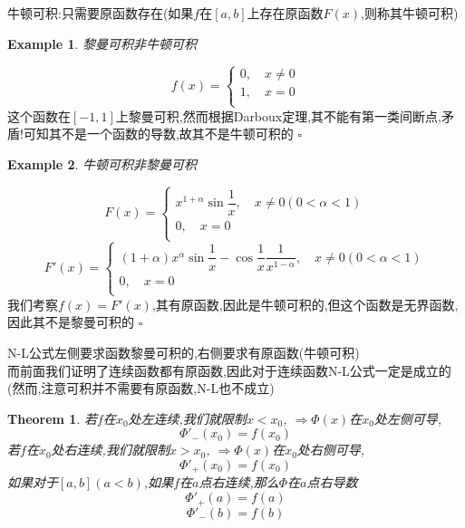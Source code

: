 \documentclass[11pt,hyperref,a4paper,UTF8]{ctexart}
\newtheorem{theorem}{Theorem}[subsection]
\newtheorem{example}{Example}[subsection]
\newenvironment{cproof}{%
\heiti{证明}\kaishu
}{%
  \hfill $\square$
  \par\bigskip
}
\begin{document}
\begin{CJK}{UTF8}{gkai}
牛顿可积:只需要原函数存在(如果$f$在$[a,b]$上存在原函数$F(x)$,则称其牛顿可积)
\begin{example}
  黎曼可积非牛顿可积
\end{example}
\begin{cproof}
  \begin{equation*}
    f(x) = \begin{cases}
      0,\quad x \neq 0\\
      1,\quad x = 0\\
    \end{cases}
  \end{equation*}
这个函数在$[-1,1]$上黎曼可积,然而根据Darboux定理,其不能有第一类间断点,矛盾!可知其不是一个函数的导数,故其不是牛顿可积的
\end{cproof}
\begin{example}
牛顿可积非黎曼可积
\end{example}
\begin{cproof}
  \begin{equation*}
    F(x) = \begin{cases}
      x^{1 + \alpha}\sin \dfrac{1}{x},\quad x \neq 0(0 < \alpha < 1)\\
      0,\quad x = 0\\
    \end{cases}
  \end{equation*}
  \begin{equation*}
    F'(x) = \begin{cases}
      (1 + \alpha)x^{\alpha}\sin \dfrac{1}{x} -\cos \dfrac{1}{x} \dfrac{1}{x^{1 - \alpha}},\quad x \neq 0(0 < \alpha < 1)\\
      0,\quad x = 0\\
    \end{cases}
  \end{equation*}  
我们考察$f(x) = F'(x)$,其有原函数,因此是牛顿可积的,但这个函数是无界函数,因此其不是黎曼可积的
\end{cproof}

N-L公式左侧要求函数黎曼可积的,右侧要求有原函数(牛顿可积)\\

而前面我们证明了连续函数都有原函数,因此对于连续函数N-L公式一定是成立的(然而,注意可积并不需要有原函数,N-L也不成立)\\
\begin{theorem}
  若$f$在$x_0$处左连续,我们就限制$x < x_0$, $\Rightarrow \varPhi(x)$在$x_0$处左侧可导,
  \[\varPhi'_-(x_0) = f(x_0)\]
  若$f$在$x_0$处右连续,我们就限制$x > x_0$, $\Rightarrow \varPhi(x)$在$x_0$处右侧可导,
  \[\varPhi'_+(x_0) = f(x_0)\]
  如果对于$[a,b](a< b)$,如果$f$在$a$点右连续,那么$\varPhi$在$a$点右导数 \[\varPhi'_+(a) = f(a)\]
  \[\varPhi'_-(b) = f(b)\]
\end{theorem}


\end{CJK}
\end{document}
